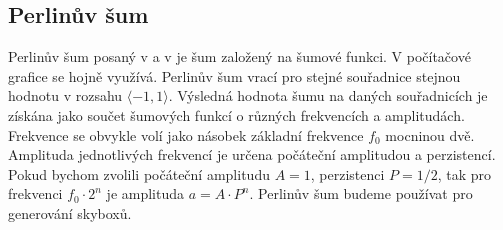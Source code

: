 \subsection{Perlinův šum}
\label{subsec:perlin}
Perlinův šum posaný v \cite{KENPERLIN} a v \cite{HUGOPERLIN} je šum založený na šumové funkci.
V počítačové grafice se hojně využívá.
Perlinův šum vrací pro stejné souřadnice stejnou hodnotu v rozsahu $\langle -1,1 \rangle$.
Výsledná hodnota šumu na daných souřadnicích je získána jako součet šumových funkcí o různých frekvencích a amplitudách.
Frekvence se obvykle volí jako násobek základní frekvence $f_0$ mocninou dvě.
Amplituda jednotlivých frekvencí je určena počáteční amplitudou a perzistencí.
Pokud bychom zvolili počáteční amplitudu $A=1$, perzistenci $P=1/2$, tak pro frekvenci $f_0 \cdot 2^n$ je amplituda $a=A \cdot P^n$.
Perlinův šum budeme používat pro generování skyboxů.


